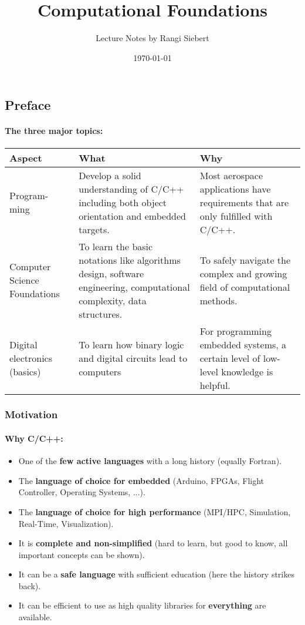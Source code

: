 \documentclass[twocolumn]{article}
\begin{document}
\title{Computational Foundations}
\author{Lecture Notes by Rangi Siebert}
\date{\today}
\maketitle
\tableofcontents

\subsection{Preface}
	\paragraph{The three major topics:}\mbox{}
	\begin{center}
		\begin{tabular}{p{1.5cm}|p{2.5cm}|p{2.5cm}}
		Aspect & What & Why\\\hline
		Program- ming & Develop a solid understanding of C/C++ including both object orientation and embedded targets. & Most aerospace applications have requirements that are only fulfilled with C/C++. \\\hline
		Computer Science Foundations & To learn the basic notations like algorithms design, software engineering, computational complexity, data structures. & To safely navigate the complex and growing field of computational methods.\\\hline
		Digital electronics (basics) & To learn how binary logic and digital circuits lead to computers & For programming embedded systems, a certain level of low-level knowledge is helpful.
	\end{tabular}
	\end{center}
	\subsubsection{Motivation}
		\paragraph{Why C/C++:}
			\begin{itemize}
			\item One of the \textbf{few active languages} with a long history (equally Fortran).
			\item The \textbf{language of choice for embedded} (Arduino, FPGAs, Flight Controller, Operating Systems, ...).
			\item The \textbf{language of choice for high performance} (MPI/HPC, Simulation, Real-Time, Visualization).
			\item It is \textbf{complete and non-simplified} (hard to learn, but good to know, all important concepts can be shown).
			\item It can be a \textbf{safe language} with sufficient education (here the history strikes back).
			\item It can be efficient to use as high quality libraries for \textbf{everything} are available.
			\end{itemize}
\end{document}
